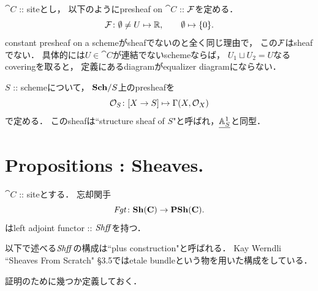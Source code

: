 \documentclass[a4paper]{jsarticle}
\begin{document}
\begin{Example}
    $\cat{C}$ :: siteとし，
    以下のようにpresheaf on $\cat{C}$ :: $\mathcal{F}$を定める．
    \[ \mathcal{F} \colon \emptyset \neq U \mapsto \mathbb{R}, \qquad \emptyset \mapsto \{0\}.  \]
    constant presheaf on a schemeがsheafでないのと全く同じ理由で，
    この$\mathcal{F}$はsheafでない．
    具体的には$U \in \cat{C}$が連結でないschemeならば，
    $U_1 \sqcup U_2=U$なるcoveringを取ると，
    定義にあるdiagramがequalizer diagramにならない．
\end{Example}

\begin{Example}
    $S$ :: schemeについて，
    $\mathbf{Sch}/S$上のpresheafを
    \[ \mathcal{O}_S \colon [X \to S] \mapsto \Gamma(X, \mathcal{O}_X) \]
    で定める．
    このsheafは``structure sheaf of $S$"と呼ばれ，$\underline{\mathbb{A}^1_S}$と同型．
\end{Example}

\section{Propositions : Sheaves.}
\begin{Thm}\label{thm:Shff}
    $\cat{C}$ :: siteとする．
    忘却関手
    \[ \mathit{Fgt} \colon \mathbf{Sh}(\mathbf{C}) \to \mathbf{PSh}(\mathbf{C}). \]
    はleft adjoint functor :: $\mathit{Shff}$を持つ．
\end{Thm}
\begin{Remark}
    以下で述べる$\mathit{Shff}$の構成は``plus construction"と呼ばれる．
    Kay Werndli ``Sheaves From Scratch" \S3.5ではetale bundleという物を用いた構成をしている．
\end{Remark}

証明のために幾つか定義しておく．
\end{document}
